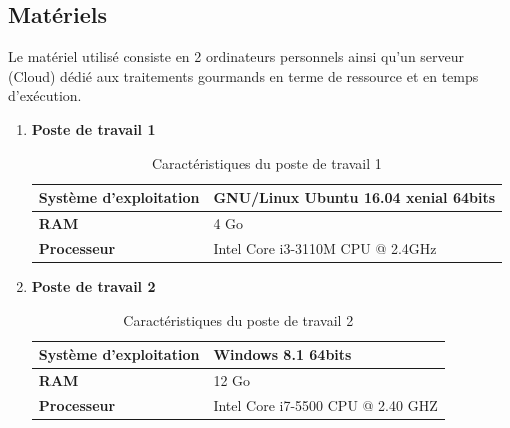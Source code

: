     \subsection{Matériels}
    Le matériel utilisé consiste en 2 ordinateurs personnels ainsi qu'un serveur (Cloud) dédié aux traitements gourmands en terme de ressource et en temps d'exécution.
    \begin{enumerate}
        \item{\textbf{Poste de travail 1}}
        \begin{table}[h!]
            \begin{center}
                \begin{tabular}{|C{5cm}|C{8cm}|}
                    \hline
                    \textbf{Système d'exploitation} &  GNU/Linux Ubuntu 16.04 xenial 64bits \\
                    \hline
                    \textbf{RAM} &  4 Go \\
                    \hline
                    \textbf{Processeur} & Intel Core i3-3110M CPU @ 2.4GHz \\
                    \hline
                \end{tabular}
            \end{center}
        \caption{Caractéristiques du poste de travail 1}
        \end{table}

        \item{\textbf{Poste de travail 2}}
        \begin{table}[h!]
            \begin{center}
                \begin{tabular}{|C{5cm}|C{8cm}|}
                    \hline
                    \textbf{Système d'exploitation} &  Windows 8.1 64bits \\
                    \hline
                    \textbf{RAM} &  12 Go \\
                    \hline
                    \textbf{Processeur} & Intel Core i7-5500 CPU @ 2.40 GHZ \\
                    \hline
                \end{tabular}
            \end{center}
        \caption{Caractéristiques du poste de travail 2}
        \end{table}


\end{enumerate}
